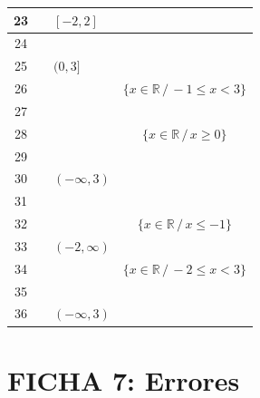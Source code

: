 \documentclass[10pt, a4paper]{article}
\begin{document}
\begin{center}
\begin{tabularx}{\textwidth}{|c|c|X|c|}
23 & & $[-2,2]$ & \\ \hline
24 & & & \\ \hline
25 & & $(0,3]$ & \\ \hline
26 & & & $\{x \in \mathbb{R} \,/\, -1 \le x < 3\}$ \\ \hline
27 & & & \\ \hline
28 & & & $\{x \in \mathbb{R} \,/\, x \ge 0\}$ \\ \hline
29 & & & \\ \hline
30 & & $(-\infty, 3)$ & \\ \hline
31 & & & \\ \hline
32 & & & $\{x \in \mathbb{R} \,/\, x \le -1\}$ \\ \hline
33 & & $(-2, \infty)$ & \\ \hline
34 & & & $\{x \in \mathbb{R} \,/\, -2 \le x < 3\}$ \\ \hline
35 & & & \\ \hline
36 & & $(-\infty, 3)$ & \\ \hline
\end{tabularx}
\end{center}

\newpage

\section*{FICHA 7: Errores}
\end{document}
